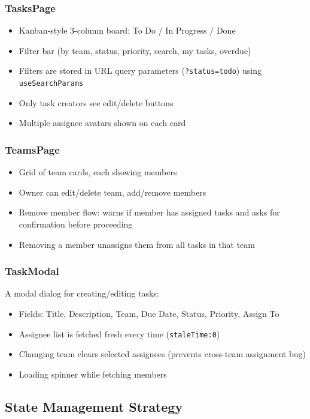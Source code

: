 \documentclass[12pt,a4paper]{article}
\begin{document}
\subsubsection{TasksPage}
\begin{itemize}
    \item Kanban-style 3-column board: To Do / In Progress / Done
    \item Filter bar (by team, status, priority, search, my tasks, overdue)
    \item Filters are stored in URL query parameters (\texttt{?status=todo}) using \texttt{useSearchParams}
    \item Only task creators see edit/delete buttons
    \item Multiple assignee avatars shown on each card
\end{itemize}

\subsubsection{TeamsPage}
\begin{itemize}
    \item Grid of team cards, each showing members
    \item Owner can edit/delete team, add/remove members
    \item Remove member flow: warns if member has assigned tasks and asks for confirmation before proceeding
    \item Removing a member unassigns them from all tasks in that team
\end{itemize}

\subsubsection{TaskModal}
A modal dialog for creating/editing tasks:
\begin{itemize}
    \item Fields: Title, Description, Team, Due Date, Status, Priority, Assign To
    \item Assignee list is fetched fresh every time (\texttt{staleTime:0})
    \item Changing team clears selected assignees (prevents cross-team assignment bug)
    \item Loading spinner while fetching members
\end{itemize}

\subsection{State Management Strategy}
\end{document}
